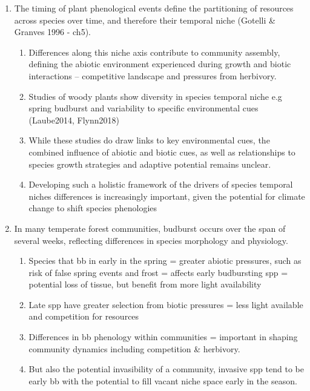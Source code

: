\documentclass{article}
\begin{document}
\begin{enumerate}
\item The timing of plant phenological events define the partitioning of resources across species over time, and therefore their temporal niche (Gotelli \& Granves 1996 - ch5).
\begin{enumerate}
\item Differences along this niche axis contribute to community assembly, defining the abiotic environment experienced during growth and biotic interactions -- competitive landscape and pressures from herbivory.
\item Studies of woody plants show diversity in species temporal niche e.g spring budburst and variability to specific environmental cues (Laube2014, Flynn2018)
\item While these studies do draw links to key environmental cues, the combined influence of abiotic and biotic cues, as well as relationships to species growth strategies and adaptive potential remains unclear.
\item Developing such a holistic framework of the drivers of species temporal niches differences is increasingly important, given the potential for climate change to shift species phenologies
\end{enumerate}

\item In many temperate forest communities, budburst occurs over the span of several weeks, reflecting differences in species morphology and physiology.
\begin{enumerate}
\item Species that bb in early in the spring = greater abiotic pressures, such as risk of false spring events and frost = affects early budbursting spp = potential loss of tissue, but benefit from more light availability
\item Late spp have greater selection from biotic pressures = less light available and competition for resources 
\item Differences in bb phenology within communities = important in shaping community dynamics including competition \& herbivory. 
\item But also the potential invasibility of a community, invasive spp tend to be early bb with the potential to fill vacant niche space early in the season. 
\end{enumerate}


\end{enumerate}
\end{document}
